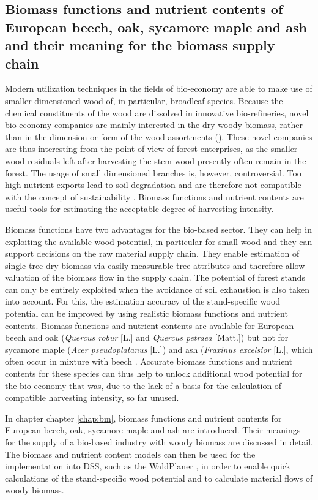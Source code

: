 \subsection{Biomass functions and nutrient contents of European beech, oak, sycamore maple and ash and their meaning for the biomass supply chain}
\label{subsec:intro:struct:bm}
Modern utilization techniques in the fields of bio-economy are able to make use of smaller dimensioned wood of, in particular, broadleaf species. Because the chemical constituents of the wood are dissolved in innovative bio-refineries, novel bio-economy companies are mainly interested in the dry woody biomass, rather than in the dimension or form of the wood assortments (\citep{ekman_2013}). These novel companies are thus interesting from the point of view of forest enterprises, as the smaller wood residuals left after harvesting the stem wood presently often remain in the forest. The usage of small dimensioned branches is, however, controversial. Too high nutrient exports lead to soil degradation and are therefore not compatible with the concept of sustainability \citep[p. 261]{pretzsch_2014}. Biomass functions and nutrient contents are useful tools for estimating the acceptable degree of harvesting intensity.

Biomass functions have two advantages for the bio-based sector. They can help in exploiting the available wood potential, in particular for small wood and they can support decisions on the raw material supply chain. They enable estimation of single tree dry biomass via easily measurable tree attributes and therefore allow valuation of the biomass flow in the supply chain. The potential of forest stands can only be entirely exploited when the avoidance of soil exhaustion is also taken into account. For this, the estimation accuracy of the stand-specific wood potential can be improved by using realistic biomass functions and nutrient contents. Biomass functions and nutrient contents are available for European beech and oak (\textit{Quercus robur} [L.] and \textit{Quercus petraea} [Matt.]) but not for sycamore maple (\textit{Acer pseudoplatanus} [L.]) and ash (\textit{Fraxinus excelsior} [L.], which often occur in mixture with beech \citep{ti_2014}. Accurate biomass functions and nutrient contents for these species can thus help to unlock additional wood potential for the bio-economy that was, due to the lack of a basis for the calculation of compatible harvesting intensity, so far unused.

In chapter chapter \ref{chap:bm}, biomass functions and nutrient contents for European beech, oak, sycamore maple and ash are introduced. Their meanings for the supply of a bio-based industry with woody biomass are discussed in detail. The biomass and nutrient content models can then be used for the implementation into DSS, such as the WaldPlaner \citep{hansen_2014}, in order to enable quick calculations of the stand-specific wood potential and to calculate material flows of woody biomass.

